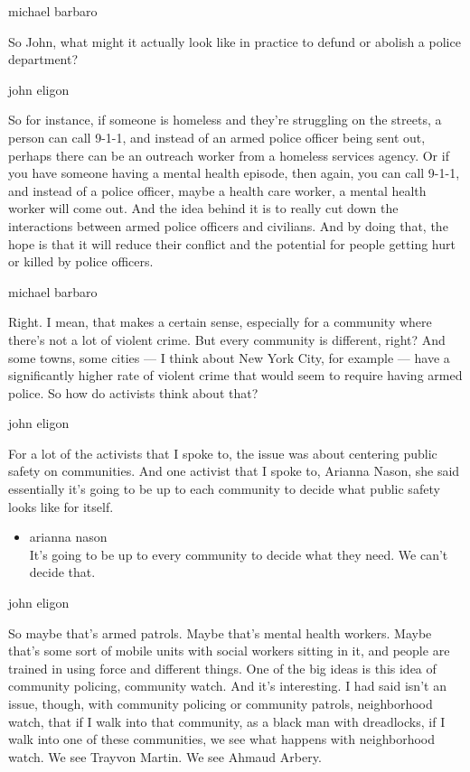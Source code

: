 michael barbaro

So John, what might it actually look like in practice to defund or
abolish a police department?

john eligon

So for instance, if someone is homeless and they're struggling on the
streets, a person can call 9-1-1, and instead of an armed police officer
being sent out, perhaps there can be an outreach worker from a homeless
services agency. Or if you have someone having a mental health episode,
then again, you can call 9-1-1, and instead of a police officer, maybe a
health care worker, a mental health worker will come out. And the idea
behind it is to really cut down the interactions between armed police
officers and civilians. And by doing that, the hope is that it will
reduce their conflict and the potential for people getting hurt or
killed by police officers.

michael barbaro

Right. I mean, that makes a certain sense, especially for a community
where there's not a lot of violent crime. But every community is
different, right? And some towns, some cities --- I think about New York
City, for example --- have a significantly higher rate of violent crime
that would seem to require having armed police. So how do activists
think about that?

john eligon

For a lot of the activists that I spoke to, the issue was about
centering public safety on communities. And one activist that I spoke
to, Arianna Nason, she said essentially it's going to be up to each
community to decide what public safety looks like for itself.

\begin{itemize}
\tightlist
\item
  arianna nason\\
  It's going to be up to every community to decide what they need. We
  can't decide that.
\end{itemize}

john eligon

So maybe that's armed patrols. Maybe that's mental health workers. Maybe
that's some sort of mobile units with social workers sitting in it, and
people are trained in using force and different things. One of the big
ideas is this idea of community policing, community watch. And it's
interesting. I had said isn't an issue, though, with community policing
or community patrols, neighborhood watch, that if I walk into that
community, as a black man with dreadlocks, if I walk into one of these
communities, we see what happens with neighborhood watch. We see Trayvon
Martin. We see Ahmaud Arbery.

